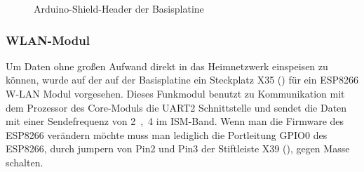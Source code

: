 \begin{figure}[H]
    \centering
    \qquad
    \qquad
    \caption[Arduino-Shield-Header der Basisplatine]{Arduino-Shield-Header der \gls{Basisplatine}}
    \label{fig:basisplatine-arduino}
\end{figure}

\subsubsection{WLAN-Modul \cite{basis:wlan}}
Um Daten ohne großen Aufwand direkt in das Heimnetzwerk einspeisen zu können, wurde auf der auf der \gls{Basisplatine} ein Steckplatz X35 () für ein ESP8266 W-LAN Modul vorgesehen. Dieses Funkmodul benutzt zu Kommunikation mit dem Prozessor des Core-Moduls die UART2 Schnittstelle und sendet die Daten mit einer Sendefrequenz von \unit{2,4}{\giga\hertz} im ISM-Band. Wenn man die Firmware des ESP8266 verändern möchte muss man lediglich die Portleitung GPIO0 des ESP8266, durch jumpern von Pin2 und Pin3 der Stiftleiste X39 (), gegen Masse schalten.

